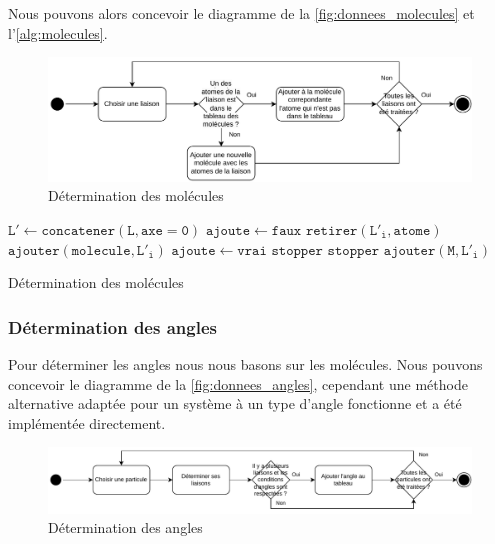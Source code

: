 \documentclass[11pt, a4paper]{article}
\begin{document}
Nous pouvons alors concevoir le diagramme de la \autoref{fig:donnees_molecules} et l'\autoref{alg:molecules}.

\begin{figure}[hpbt]
	\centering
	\includegraphics[width=\linewidth]{donnees-molecules.pdf}
	\caption{Détermination des molécules}
	\label{fig:donnees_molecules}
\end{figure}

\begin{algorithm}[hpbt]
	\Deb%
	{
		$\mathtt{L' \gets concatener(L, axe=0)}$\;
		{
			$\mathtt{ajoute \gets faux}$\;
			{
				{
					{
						$\mathtt{retirer(L'_i, atome)}$\;
						$\mathtt{ajouter(molecule, L'_i)}$\;
						$\mathtt{ajoute \gets vrai}$\;
						$\mathtt{stopper}$\;
					}
				}
				{
					$\mathtt{stopper}$\;
				}
			}
			{
				$\mathtt{ajouter(M, L'_i)}$\;
			}
		}
	}
	\caption{Détermination des molécules}
	\label{alg:molecules}
\end{algorithm}

		\subsubsection{Détermination des angles}

Pour déterminer les angles nous nous basons sur les molécules. Nous pouvons concevoir le diagramme de la \autoref{fig:donnees_angles}, cependant une méthode alternative adaptée pour un système à un type d'angle fonctionne et a été implémentée directement.

\begin{figure}[hbpt]
	\centering
	\includegraphics[width=\linewidth]{donnees-angles.pdf}
	\caption{Détermination des angles}
	\label{fig:donnees_angles}
\end{figure}
\end{document}
